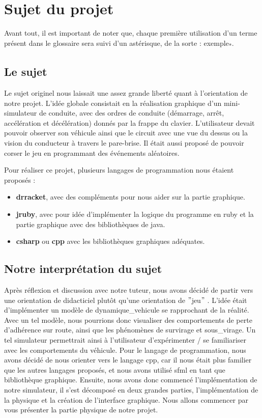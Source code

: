 \usepackage{glossaries}\section{Sujet du projet}\label{sec:sujet-du-projet}
Avant tout, il est important de noter que, chaque première utilisation d'un terme présent dans le glossaire sera suivi d'un astérisque, de la sorte : exemple\textsubscript{*}.
\subsection{Le sujet}\label{subsec:le-sujet}
Le sujet originel nous laissait une assez grande liberté quant à l'orientation de notre projet.
L'idée globale consistait en la réalisation graphique d'un mini-simulateur de conduite, avec des ordres de conduite (démarrage, arrêt, accélération et décélération) donnés par la frappe du clavier.
L'utilisateur devait pouvoir observer son véhicule ainsi que le circuit avec une vue du dessus ou la vision du conducteur à travers le pare-brise.
Il était aussi proposé de pouvoir \og corser\fg{} le jeu en programmant des événements aléatoires.

Pour réaliser ce projet, plusieurs langages de programmation nous étaient proposés :
\begin{itemize}
    \item \textbf{\gls{drracket}}, avec des compléments pour nous aider sur la partie graphique.
    \item \textbf{\gls{jruby}}, avec pour idée d'implémenter la logique du programme en \gls{ruby} et la partie graphique avec des bibliothèques de \gls{java}.
    \item \textbf{\gls{csharp}} ou \textbf{\gls{cpp}} avec les bibliothèques graphiques adéquates.
\end{itemize}


\subsection{Notre interprétation du sujet}\label{subsec:notre-interpretation-du-sujet-/-objectif-du-sujet}
Après réflexion et discussion avec notre tuteur, nous avons décidé de partir vers une orientation de didacticiel plutôt qu'une \og orientation de \("\)jeu\("\) \fg{}.
L'idée était d'implémenter un modèle de \gls{dynamique_vehicule} se rapprochant de la réalité.
Avec un tel modèle, nous pourrions donc visualiser des comportements de perte d'adhérence sur route, ainsi que les phénomènes de \gls{survirage} et \gls{sous_virage}.
Un tel simulateur permettrait ainsi à l'utilisateur d'expérimenter / se familiariser avec les comportements du véhicule.
Pour le langage de programmation, nous avons décidé de nous orienter vers le langage \gls{cpp}, car il nous était plus familier que les autres langages proposés, et nous avons utilisé \gls{sfml} en tant que bibliothèque graphique.
Ensuite, nous avons donc commencé l'implémentation de notre simulateur, il s'est décomposé en deux grandes parties, l'implémentation de la physique et la création de l'interface graphique.
Nous allons commencer par vous présenter la partie physique de notre projet.

\newpage